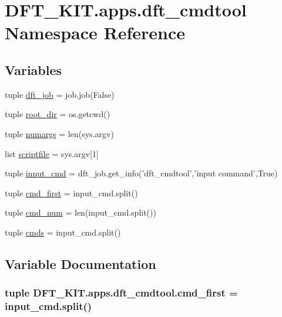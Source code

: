 \hypertarget{namespace_d_f_t___k_i_t_1_1apps_1_1dft__cmdtool}{\section{D\+F\+T\+\_\+\+K\+I\+T.\+apps.\+dft\+\_\+cmdtool Namespace Reference}
\label{namespace_d_f_t___k_i_t_1_1apps_1_1dft__cmdtool}
}
\subsection*{Variables}
\begin{DoxyCompactItemize}
\item 
tuple \hyperlink{namespace_d_f_t___k_i_t_1_1apps_1_1dft__cmdtool_a199f85e4cd240a8ea565d8d8638cca2e}{dft\+\_\+job} = job.\+job(False)
\item 
tuple \hyperlink{namespace_d_f_t___k_i_t_1_1apps_1_1dft__cmdtool_ae64fc152ecc9625928d1b894c9509b63}{root\+\_\+dir} = os.\+getcwd()
\item 
tuple \hyperlink{namespace_d_f_t___k_i_t_1_1apps_1_1dft__cmdtool_ad379ce6f66c010b507abcc8decec82c6}{numargs} = len(sys.\+argv)
\item 
list \hyperlink{namespace_d_f_t___k_i_t_1_1apps_1_1dft__cmdtool_ad9689f4893a4dde9249d301ef1d932e0}{scriptfile} = sys.\+argv\mbox{[}1\mbox{]}
\item 
tuple \hyperlink{namespace_d_f_t___k_i_t_1_1apps_1_1dft__cmdtool_aa0e3413d9ae4c07c0b02d807cdc6db8f}{input\+\_\+cmd} = dft\+\_\+job.\+get\+\_\+info('dft\+\_\+cmdtool','input command',True)
\item 
tuple \hyperlink{namespace_d_f_t___k_i_t_1_1apps_1_1dft__cmdtool_a2f9c5ee4d542f8399dd8338856ee309c}{cmd\+\_\+first} = input\+\_\+cmd.\+split()
\item 
tuple \hyperlink{namespace_d_f_t___k_i_t_1_1apps_1_1dft__cmdtool_a4df77ff242ff65823d46090c1f2264a9}{cmd\+\_\+num} = len(input\+\_\+cmd.\+split())
\item 
tuple \hyperlink{namespace_d_f_t___k_i_t_1_1apps_1_1dft__cmdtool_ae4e59628a7aea11f8ee1b4f913d7f6e3}{cmds} = input\+\_\+cmd.\+split()
\end{DoxyCompactItemize}


\subsection{Variable Documentation}
\hypertarget{namespace_d_f_t___k_i_t_1_1apps_1_1dft__cmdtool_a2f9c5ee4d542f8399dd8338856ee309c}{
\subsubsection[{cmd\+\_\+first}]{\setlength{\rightskip}{0pt plus 5cm}tuple D\+F\+T\+\_\+\+K\+I\+T.\+apps.\+dft\+\_\+cmdtool.\+cmd\+\_\+first = input\+\_\+cmd.\+split()}}\label{namespace_d_f_t___k_i_t_1_1apps_1_1dft__cmdtool_a2f9c5ee4d542f8399dd8338856ee309c}


